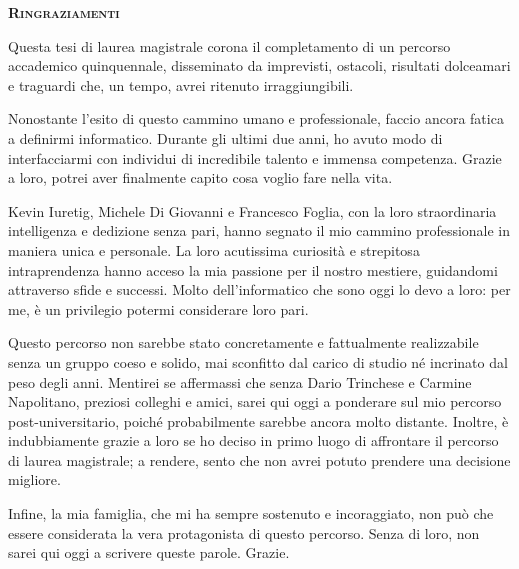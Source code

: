 % 
% 
% 




\newpage
\thispagestyle{empty}

\clearpage
\cleardoublepage
{}

\pagestyle{plain}

{}


\vspace*{\fill}

\begin{center}
    \large \textbf{\textsc{Ringraziamenti}}
\end{center}

Questa tesi di laurea magistrale corona il completamento di un percorso accademico quinquennale, disseminato da imprevisti, ostacoli, risultati dolceamari e traguardi che, un tempo, avrei ritenuto irraggiungibili. 

Nonostante l'esito di questo cammino umano e professionale, faccio ancora fatica a definirmi informatico. Durante gli ultimi due anni, ho avuto modo di interfacciarmi con individui di incredibile talento e immensa competenza. Grazie a loro, potrei aver finalmente capito cosa voglio fare nella vita.

Kevin Iuretig, Michele Di Giovanni e Francesco Foglia, con la loro straordinaria intelligenza e dedizione senza pari, hanno segnato il mio cammino professionale in maniera unica e personale. La loro acutissima curiosità e strepitosa intraprendenza hanno acceso la mia passione per il nostro mestiere, guidandomi attraverso sfide e successi. Molto dell'informatico che sono oggi lo devo a loro: per me, è un privilegio potermi considerare loro pari.

Questo percorso non sarebbe stato concretamente e fattualmente realizzabile senza un gruppo coeso e solido, mai sconfitto dal carico di studio né incrinato dal peso degli anni. Mentirei se affermassi che senza Dario Trinchese e Carmine Napolitano, preziosi colleghi e amici, sarei qui oggi a ponderare sul mio percorso post-universitario, poiché probabilmente sarebbe ancora molto distante. Inoltre, è indubbiamente grazie a loro se ho deciso in primo luogo di affrontare il percorso di laurea magistrale; a rendere, sento che non avrei potuto prendere una decisione migliore.

Infine, la mia famiglia, che mi ha sempre sostenuto e incoraggiato, non può che essere considerata la vera protagonista di questo percorso. Senza di loro, non sarei qui oggi a scrivere queste parole. Grazie.

\vspace*{\fill}

